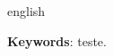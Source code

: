 
\begin{resumo}[Abstract]
 \begin{otherlanguage*}{english}
	
   \textbf{Keywords}: teste.
 \end{otherlanguage*}
\end{resumo}

